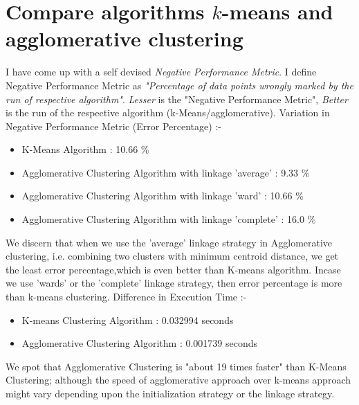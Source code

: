 \documentclass[a4paper, 12pt]{article}
\begin{document}
\section{Compare algorithms $k$-means and agglomerative clustering}
I have come up with a self devised \emph{Negative Performance Metric}. I define Negative Performance Metric as \emph{"Percentage of data points wrongly marked by the run of respective algorithm"}. \emph{Lesser} is the "Negative Performance Metric", \emph{Better} is the run of the respective algorithm (k-Means/agglomerative). Variation in Negative Performance Metric (Error Percentage) :-
\begin{itemize}
\item K-Means Algorithm : 10.66 \%
\item Agglomerative Clustering Algorithm with linkage 'average' : 9.33 \%
\item Agglomerative Clustering Algorithm with linkage 'ward' : 10.66 \%
\item Agglomerative Clustering Algorithm with linkage 'complete' : 16.0 \%
\end{itemize}
We discern that when we use the 'average' linkage strategy in Agglomerative clustering, i.e. combining two clusters with minimum centroid distance, we get the least error percentage,which is even better than K-means algorithm. Incase we use 'wards' or the 'complete' linkage strategy, then error percentage is more than k-means clustering. Difference in Execution Time :-
\begin{itemize}
\item K-means Clustering Algorithm : 0.032994 seconds
\item Agglomerative Clustering Algorithm : 0.001739 seconds
\end{itemize}
We spot that Agglomerative Clustering is "about 19 times faster" than K-Means Clustering; although the speed of agglomerative approach over k-means approach might vary depending upon the initialization strategy or the linkage strategy.
\end{document}
